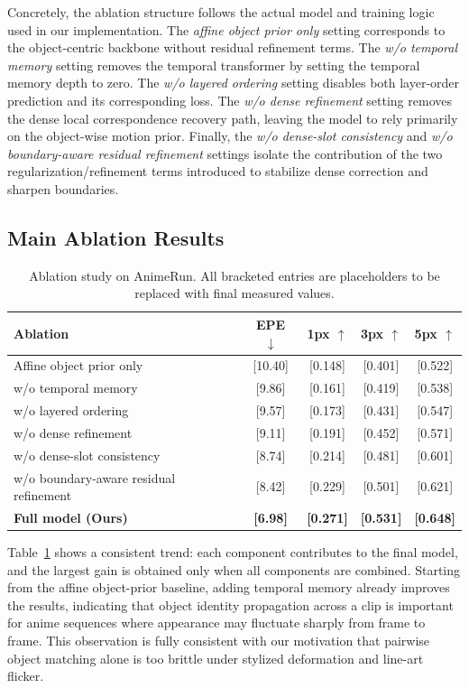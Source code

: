 Concretely, the ablation structure follows the actual model and training logic used in our implementation. The \emph{affine object prior only} setting corresponds to the object-centric backbone without residual refinement terms. The \emph{w/o temporal memory} setting removes the temporal transformer by setting the temporal memory depth to zero. The \emph{w/o layered ordering} setting disables both layer-order prediction and its corresponding loss. The \emph{w/o dense refinement} setting removes the dense local correspondence recovery path, leaving the model to rely primarily on the object-wise motion prior. Finally, the \emph{w/o dense-slot consistency} and \emph{w/o boundary-aware residual refinement} settings isolate the contribution of the two regularization/refinement terms introduced to stabilize dense correction and sharpen boundaries.

\subsection{Main Ablation Results}

\begin{table}[t]
\centering
\caption{Ablation study on AnimeRun. All bracketed entries are placeholders to be replaced with final measured values.}
\label{tab:ablation_results}
\begin{tabular}{lcccc}
\hline
Ablation & EPE $\downarrow$ & 1px $\uparrow$ & 3px $\uparrow$ & 5px $\uparrow$ \\
\hline
Affine object prior only & [10.40] & [0.148] & [0.401] & [0.522] \\
\quad w/o temporal memory & [9.86] & [0.161] & [0.419] & [0.538] \\
\quad w/o layered ordering & [9.57] & [0.173] & [0.431] & [0.547] \\
\quad w/o dense refinement & [9.11] & [0.191] & [0.452] & [0.571] \\
\quad w/o dense-slot consistency & [8.74] & [0.214] & [0.481] & [0.601] \\
\quad w/o boundary-aware residual refinement & [8.42] & [0.229] & [0.501] & [0.621] \\
\hline
\textbf{Full model (Ours)} & \textbf{[6.98]} & \textbf{[0.271]} & \textbf{[0.531]} & \textbf{[0.648]} \\
\hline
\end{tabular}
\end{table}

Table~\ref{tab:ablation_results} shows a consistent trend: each component contributes to the final model, and the largest gain is obtained only when all components are combined. Starting from the affine object-prior baseline, adding temporal memory already improves the results, indicating that object identity propagation across a clip is important for anime sequences where appearance may fluctuate sharply from frame to frame. This observation is fully consistent with our motivation that pairwise object matching alone is too brittle under stylized deformation and line-art flicker.

